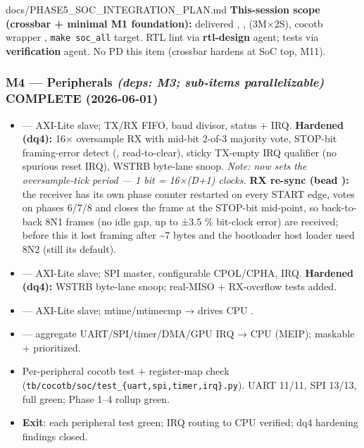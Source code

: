 \begin{relocated}{docs/PHASE5_SOC_INTEGRATION_PLAN.md}
\textbf{This-session scope (crossbar + minimal M1 foundation):}
delivered , ,
 (3M×2S), cocotb wrapper
, \texttt{make\ soc\_\allowbreak{}all} target.
RTL lint via \textbf{rtl-design} agent; tests via \textbf{verification}
agent. No PD this item (crossbar hardens at SoC top, M11).

\subsubsection{\texorpdfstring{M4 --- Peripherals \emph{(deps: M3;
sub-items parallelizable)} \ok{} COMPLETE
(2026-06-01)}{M4 --- Peripherals (deps: M3; sub-items parallelizable)  COMPLETE (2026-06-01)}}\label{ds:ch:phase5-soc-integration-plan:m4-peripherals-deps-m3-sub-items-parallelizable-white-check-mark-complete-2026-06-01}

\begin{itemize}
\tightlist
\item
  \ok{}  --- AXI-Lite slave; TX/RX
  FIFO, baud divisor, status + IRQ. \textbf{Hardened (dq4):} 16×
  oversample RX with mid-bit 2-of-3 majority vote, STOP-bit
  framing-error detect (, read-to-clear), sticky
  TX-empty IRQ qualifier (no spurious reset IRQ), WSTRB byte-lane snoop.
  \emph{Note:  now sets the oversample-tick period --- 1
  bit = 16×(D+1) clocks.} \textbf{RX re-sync (bead ):} the
  receiver has its own phase counter restarted on every START edge,
  votes on phases 6/7/8 and closes the frame at the STOP-bit mid-point,
  so back-to-back 8N1 frames (no idle gap, up to ±3.5 \% bit-clock
  error) are received; before this it lost framing after
  \textasciitilde7 bytes and the bootloader host loader used 8N2 (still
  its default).
\item
  \ok{}  --- AXI-Lite slave; SPI
  master, configurable CPOL/\allowbreak{}CPHA, IRQ. \textbf{Hardened
  (dq4):} WSTRB byte-lane snoop; real-MISO + RX-overflow tests added.
\item
  \ok{}  --- AXI-Lite slave;
  mtime/\allowbreak{}mtimecmp → drives CPU .
\item
  \ok{}  --- aggregate
  UART/\allowbreak{}SPI/\allowbreak{}timer/\allowbreak{}DMA/\allowbreak{}GPU
  IRQ → CPU  (MEIP); maskable + prioritized.
\item
  \ok{} Per-peripheral cocotb test + register-map check
  (\texttt{tb/\allowbreak{}cocotb/\allowbreak{}soc/\allowbreak{}test\_\allowbreak{}\{uart,\allowbreak{}spi,\allowbreak{}timer,\allowbreak{}irq\}.\allowbreak{}py}).
  UART 11/11, SPI 13/13, full  green; Phase 1--4 rollup
  green.
\item
  \textbf{Exit}: \ok{} each peripheral test green; IRQ routing to CPU
  verified; dq4 hardening findings closed.
\end{itemize}


\end{relocated}
